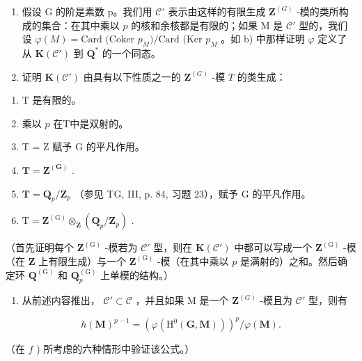 \begin{enumerate}
\def\labelenumi{\alph{enumi})}
\setcounter{enumi}{3}
\item
  假设 G 的阶是素数 p。我们用 \(\mathcal{C}'\) 表示由这样的有限生成 \(\mathbf{Z}^{(G)}\) -模的类所构成的集合：在其中乘以 \(p\) 的核和余核都是有限的；如果 M 是 \(\mathcal{C}'\) 型的，我们设 \(\varphi(M) = \text{Card (Coker } p_M)/\text{Card (Ker } p_M\) 。如 b) 中那样证明 \(\varphi\) 定义了从 \(\mathbf{K}(\mathcal{C}')\) 到 \(\mathbf{Q}^*\) 的一个同态。
\item
  证明 \(\mathbf{K}(\mathcal{C}')\) 由具有以下性质之一的 \(\mathbf{Z}^{(G)}\) -模 \(T\) 的类生成：
\end{enumerate}

\begin{enumerate}
\def\labelenumi{(\roman{enumi})}
\item
  T 是有限的。
\item
  乘以 \(p\) 在T中是双射的。
\item
  T = Z 赋予 G 的平凡作用。
\item
  \(\mathbf{T} = \mathbf{Z}^{(\mathbf{G})}\) .
\item
  \(\mathbf{T} = \mathbf{Q}_p / \mathbf{Z}_p\) （参见 TG, III, p. 84, 习题 23），赋予 G 的平凡作用。
\item
  \(\mathrm{T} = \mathbf{Z}^{(\mathrm{G})}\otimes_{\mathbf{Z}}(\mathbf{Q}_p / \mathbf{Z}_p)\) .
\end{enumerate}

（首先证明每个 \(\mathbf{Z}^{(\mathrm{G})}\) -模若为 \(\mathcal{C}'\) 型，则在 \(\mathbf{K}(\mathcal{C}')\) 中都可以写成一个 \(\mathbf{Z}^{(\mathrm{G})}\) -模（在 \(\mathbf{Z}\) 上有限生成）与一个 \(\mathbf{Z}^{(\mathrm{G})}\) -模（在其中乘以 \(p\) 是满射的）之和。然后确定环 \(\mathbf{Q}^{(\mathrm{G})}\) 和 \(\mathbf{Q}_p^{(\mathrm{G})}\) 上单模的结构。）

\begin{enumerate}
\def\labelenumi{\alph{enumi})}
\setcounter{enumi}{6}
\tightlist
\item
  从前述内容推出， \(\mathcal{C}' \subset \mathcal{C}\) ，并且如果 M 是一个 \(\mathbf{Z}^{(G)}\) -模且为 \(\mathcal{C}'\) 型，则有
\end{enumerate}

\[
h (\mathbf {M}) ^ {p - 1} = \left(\varphi \left(\mathrm{H} ^ {0} (\mathbf {G}, \mathbf {M})\right)\right) ^ {p} / \varphi (\mathbf {M}).
\]

（在 \(f\) ) 所考虑的六种情形中验证该公式。）


